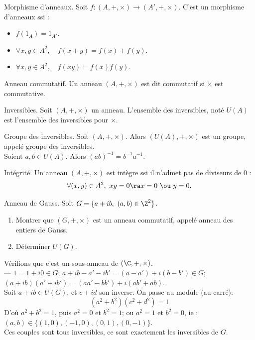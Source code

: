 \documentclass[11pt]{article}
\begin{document}
\begin{rappel}{Morphisme d'anneaux.}{}
    Soit $f:(A,+,\times)\to(A',+,\times)$. C'est un morphisme d'anneaux ssi :
    \begin{itemize}
        \item $f(1_A)=1_{A'}$.
        \item $\forall x,y \in A^2, \quad f(x+y)=f(x)+f(y)$.
        \item $\forall x,y \in A^2, \quad f(xy)=f(x)f(y)$.
    \end{itemize}
\end{rappel}

\begin{defi}{Anneau commutatif.}{}
    Un anneau $(A,+,\times)$ est dit commutatif si $\times$ est commutative.
\end{defi}

\begin{defi}{Inversibles.}{}
    Soit $(A,+,\times)$ un anneau. L'ensemble des inversibles, noté $U(A)$ est l'ensemble des inversibles pour $\times$.
\end{defi}

\begin{rappel}{Groupe des inversibles.}{}
    Soit $(A,+,\times)$. Alors $(U(A),+,\times)$ est un groupe, appelé groupe des inversibles.\\
    Soient $a,b\in U(A)$. Alors $(ab)^{-1}=b^{-1}a^{-1}$.
\end{rappel}

\begin{defi}{Intégrité.}{}
    Un anneau $(A,+,\times)$ est intègre ssi il n'admet pas de diviseurs de $0$ :
    \begin{equation*}
        \forall (x,y) \in A^2, ~ xy = 0 \ra x = 0 ~\ou~ y = 0.
    \end{equation*}
\end{defi}

\begin{ex}{Anneau de Gauss.}{}
    Soit $G=\{a+ib, ~ (a,b)\in\Z^2\}$.
    \begin{enumerate}
        \item Montrer que $(G,+,\times)$ est un anneau commutatif, appelé anneau des entiers de Gauss.
        \item Déterminer $U(G)$. 
    \end{enumerate}
    \tcblower
     Vérifions que c'est un sous-anneau de $(\C,+,\times)$.\\
    --- $1=1+i0\in G$; $a+ib-a'-ib'=(a-a')+i(b-b')\in G$; $(a+ib)(a'+ib')=(aa'-bb')+i(ab'+ab)$.\\
     Soit $a+ib\in U(G)$, et $c+id$ son inverse. On passe au module (au carré):
    \begin{equation*}
        (a^2+b^2)(c^2+d^2)=1
    \end{equation*}
    D'où $a^2+b^2=1$, puis $a^2=0$ et $b^2=1$; ou $a^2=1$ et $b^2=0$, ie : $(a,b)\in\{(1,0),(-1,0),(0,1),(0,-1)\}$.\\
    Ces couples sont tous inversibles, ce sont exactement les inversibles de $G$.
\end{ex}
\end{document}
